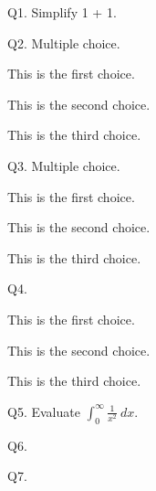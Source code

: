 


\renewcommand\COURSENAME{[This is the long form of the course name]}
\renewcommand\COURSESHORTNAME{[Short course name]}
\renewcommand\COURSENUMBER{CISS999}
\renewcommand\TITLE{Quiz 42}
\usepackage{python}


\topmatter


Q1. Simplify 1 + 1.

Q2. Multiple choice.
\begin{tightlist}
\item[\qed] This is the first choice.
\item[\qed] This is the second choice.
\item[\qed] This is the third choice.
\end{tightlist}

Q3. Multiple choice.
\begin{tightlist}
\item[$\bigcirc$] This is the first choice.
\item[$\bigcirc$] This is the second choice.
\item[$\bigcirc$] This is the third choice.
\end{tightlist}


Q4. \lipsum[1]
\vspace{-\parskip}
\begin{mylist}
\item[$\bigcirc$] This is the first choice.
\item[$\bigcirc$] This is the second choice.
\item[$\bigcirc$] This is the third choice.
\end{mylist}


Q5. Evaluate $\int_0^\infty \frac{1}{x^2} \ dx$.

Q6. \lipsum[3-5]

Q7. \lipsum[6]


